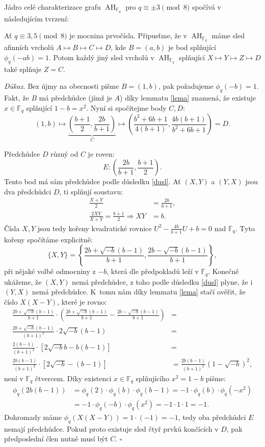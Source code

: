 \documentclass[12pt]{report}
\DeclareMathOperator{\AH}{AH}
\begin{document}
Jádro celé charakterizace grafu $\AH_{\mathbb{F}_q}$ pro $q \equiv \pm 3 \pmod{8}$ spočívá v následujícím tvrzení:

\begin{lemma}\label{smol}
Ať $q \equiv 3,5 \pmod{8}$ je mocnina prvočísla. Připusťme, že v $\AH_{\mathbb{F}_q}$ máme sled afinních vrcholů $A \longmapsto B \longmapsto C \longmapsto D$, kde $B = (a,b)$ je bod splňující $\phi_q(-ab) = 1$. Potom každý jiný sled vrcholů v $\AH_{\mathbb{F}_q}$ splňující $X \longmapsto Y \longmapsto Z \longmapsto D$ také splňuje $Z = C$.
\end{lemma}
\noindent \textit{Důkaz.} Bez újmy na obecnosti pišme $B = (1,b)$, pak požadujeme $\phi_q(-b)=1$. Fakt, že $B$ má předchůdce (jímž je $A$) díky lemmatu \ref{lema} znamená, že existuje $x \in \mathbb{F}_q$ splňující $1-b = x^2$. Nyní si spočítejme body $C,D$:
$$ (1,b) \longmapsto \underbrace{\left(\frac{b+1}{2}, \frac{2b}{b+1} \right)}_{C} \longmapsto \left( \frac{b^2+6b+1}{4(b+1)}, \frac{4b(b+1)}{b^2+6b+1} \right) = D. $$

Předchůdce $D$ různý od $C$ je roven:
$$E : \left(\frac{2b}{b+1}, \frac{b+1}{2} \right).$$
Tento bod má sám předchůdce podle důsledku \ref{dusl}. Ať $(X,Y)$ a $(Y,X)$ jsou dva předchůdci $D$, ti splňují soustavu:
\begin{align*}
\frac{X+Y}{2} &= \frac{2b}{b+1},\\
\frac{2XY}{X+Y} =  \frac{b+1}{2} \Rightarrow XY &= b.
\end{align*}
Čísla $X,Y$ jsou tedy kořeny kvadratické rovnice $U^2 - \frac{4b}{b+1} U + b = 0$ nad $\mathbb{F}_q$. Tyto kořeny spočítáme explicitně:
$$\lbrace X,Y \rbrace = \left\lbrace \frac{2b + \sqrt{-b}(b-1)}{b+1},\frac{2b - \sqrt{-b}(b-1)}{b+1} \right\rbrace,$$
při nějaké volbě odmocniny z $-b$, která dle předpokladů leží v $\mathbb{F}_q$. Konečně ukážeme, že $(X,Y)$ nemá předchůdce, z toho podle důsledku \ref{dusl} plyne, že i $(Y,X)$ nemá předchůdce. K~tomu nám díky lemmatu \ref{lema} stačí ověřit, že číslo $X(X-Y)$, které je rovno:
\begin{align*}
\frac{2b + \sqrt{-b}(b-1)}{b+1} \cdot \left( \frac{2b + \sqrt{-b}(b-1)}{b+1} - \frac{2b - \sqrt{-b}(b-1)}{b+1} \right) &=\\
\frac{2b + \sqrt{-b}(b-1)}{(b+1)^2} \cdot 2 \sqrt{-b}(b-1)&=\\
\frac{2 (b-1)}{(b+1)^2} \cdot [2 \sqrt{-b} b - b(b-1)] &=\\
\frac{2 b(b-1)}{(b+1)^2} \cdot [2 \sqrt{-b}-(b-1)] &= \frac{2 b(b-1)}{(b+1)^2} (1-\sqrt{-b})^2,
\end{align*}
není v $\mathbb{F}_q$ čtvercem. Díky existenci $x \in \mathbb{F}_q$ splňujícího $x^2 = 1-b$ pišme:
\begin{align*}
\phi_q( 2 b (b-1)) &= \phi_q (2) \cdot \phi_q(b) \cdot \phi_q(b-1) = -1 \cdot \phi_q(b) \cdot \phi_q(-x^2)\\
&= -1 \cdot \phi_q (-b) \cdot \phi_q(x^2) = -1 \cdot 1 \cdot 1 = -1.
\end{align*}
Dohromady máme $\phi_q (X(X-Y)) = 1 \cdot (-1) = -1$, tedy oba předchůdci $E$ nemají předchůdce. Pokud proto existuje sled čtyř prvků končících v $D$, pak předposlední člen nutně musí být $C$. \hfill $\square$
\end{document}
